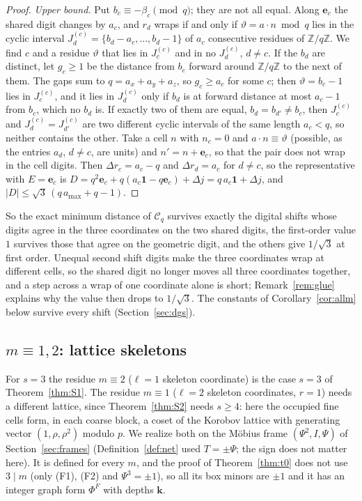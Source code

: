 \documentclass[11pt]{amsart}
\theoremstyle{definition}
\theoremstyle{plain}
\newcommand{\Z}{\mathbb{Z}}
\newcommand{\e}{\mathbf{e}}
\begin{document}
\begin{proof}
\emph{Upper bound.} Put $b_c\equiv-\beta_c\pmod q$; they are not all equal. Along $\e_c$ the shared digit changes by $a_c$, and $r_d$ wraps if and only if $\vartheta=a\cdot n\bmod q$ lies in the cyclic interval $J^{(c)}_d=\{b_d-a_c,\dots,b_d-1\}$ of $a_c$ consecutive residues of $\Z/q\Z$. We find $c$ and a residue $\vartheta$ that lies in $J^{(c)}_c$ and in no $J^{(c)}_d$, $d\ne c$. If the $b_d$ are distinct, let $g_c\ge1$ be the distance from $b_c$ forward around $\Z/q\Z$ to the next of them. The gaps sum to $q=a_x+a_y+a_z$, so $g_c\ge a_c$ for some $c$; then $\vartheta=b_c-1$ lies in $J^{(c)}_c$, and it lies in $J^{(c)}_d$ only if $b_d$ is at forward distance at most $a_c-1$ from $b_c$, which no $b_d$ is. If exactly two of them are equal, $b_d=b_{d'}\ne b_c$, then $J^{(c)}_c$ and $J^{(c)}_d=J^{(c)}_{d'}$ are two different cyclic intervals of the same length $a_c<q$, so neither contains the other. Take a cell $n$ with $n_c=0$ and $a\cdot n\equiv\vartheta$ (possible, as the entries $a_d$, $d\ne c$, are units) and $n'=n+\e_c$, so that the pair does not wrap in the cell digits. Then $\Delta r_c=a_c-q$ and $\Delta r_d=a_c$ for $d\ne c$, so the representative with $E=\e_c$ is $D=q^2\e_c+q(a_c\mathbf 1-q\e_c)+\Delta j=q\,a_c\mathbf 1+\Delta j$, and $|D|\le\sqrt3\,(q\,a_{\max}+q-1)$.
\end{proof}

So the exact minimum distance of $\mathcal C_q$ survives exactly the digital shifts whose digits agree in the three coordinates on the two shared digits, the first-order value $1$ survives those that agree on the geometric digit, and the others give $1/\sqrt3$ at first order. Unequal second shift digits make the three coordinates wrap at different cells, so the shared digit no longer moves all three coordinates together, and a step across a wrap of one coordinate alone is short; Remark~\ref{rem:glue} explains why the value then drops to $1/\sqrt3$. The constants of Corollary~\ref{cor:allm} below survive every shift (Section~\ref{sec:dgs}).
\subsection{\texorpdfstring{$m\equiv1,2$}{m = 1, 2}: lattice skeletons}\label{sec:allm}
For $s=3$ the residue $m\equiv2$ ($\ell=1$ skeleton coordinate) is the case $s=3$ of Theorem~\ref{thm:S1}. The residue $m\equiv1$ ($\ell=2$ skeleton coordinates, $r=1$) needs a different lattice, since Theorem~\ref{thm:S2} needs $s\ge4$: here the occupied fine cells form, in each coarse block, a coset of the Korobov lattice with generating vector $(1,\rho,\rho^2)$ modulo $p$. We realize both on the M\"obius frame $(\Psi^2,I,\Psi)$ of Section~\ref{sec:frames} (Definition~\ref{def:net} used $T=\pm\Psi$; the sign does not matter here). It is defined for every $m$, and the proof of Theorem~\ref{thm:t0} does not use $3\mid m$ (only (F1), (F2) and $\Psi^3=\pm1$), so all its box minors are $\pm1$ and it has an integer graph form $\Phi^F$ with depths $\mathbf k$.
\end{document}
